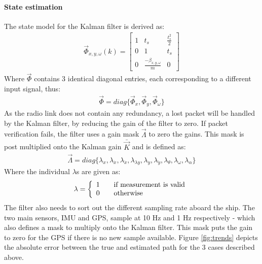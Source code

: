 \documentclass[a0,portrait]{a0poster}
\begin{document}
\begin{center}
{\paragraph{State estimation}
The state model for the Kalman filter is derived as:
\begin{align}
\vec{\Phi}_{x,y,\omega}(k) = \begin{bmatrix}
1 & t_s & \frac{t_s^2}{2}\\
0 & 1 & t_s\\
0 & \frac{-\beta_{x,y,\omega}}{m} & 0
\end{bmatrix}
\end{align}
Where $\vec{\Phi}$ contains 3 identical diagonal entries, each corresponding to a different input signal, thus:
\begin{align}
\vec{\Phi} = diag\{\vec{\Phi}_x,\vec{\Phi}_y,\vec{\Phi}_\omega\}
\end{align}
As the radio link does not contain any redundancy, a lost packet will be handled by the Kalman filter, by reducing the gain of the filter to zero. If packet verification fails, the filter uses a gain mask $\vec{\Lambda}$ to zero the gains. This mask is post multiplied onto the Kalman gain $\bar{\vec{K}}$ and is defined as:
\begin{align}
\vec{\Lambda} = diag\{\lambda_x,\lambda_{\dot{x}},\lambda_{\ddot{x}},\lambda_{\lambda{y}},\lambda_{\dot{y}},\lambda_{\ddot{y}},\lambda_{\theta},\lambda_{\omega},\lambda_{\alpha} \}
\end{align}
Where the individual $\lambda$s are given as:
\begin{align}
\lambda = 
\left\{ 
  \begin{array}{l l}
    1 & \quad \text{if measurement is valid}\\
    0 & \quad \text{otherwise}
  \end{array} \right.
\end{align} 
The filter also needs to sort out the different sampling rate aboard the ship. The two main sensors, IMU and GPS, sample at 10 Hz and 1 Hz respectively - which also defines a mask to multiply onto the Kalman filter. This mask puts the gain to zero for the GPS if there is no new sample available. Figure \vref{fig:trends} depicts the absolute error between the true and estimated path for the 3 cases described above. 

}
\end{center}
\end{document}
